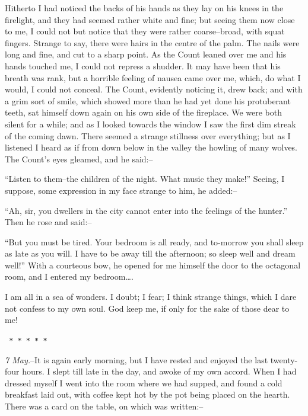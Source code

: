 \documentclass[12pt,openright]{book}
\begin{document}
Hitherto I had noticed the backs of his hands as they lay on his knees in the firelight, and they had seemed rather white and fine; but seeing them now close to me, I could not but notice that they were rather coarse–broad, with squat fingers. Strange to say, there were hairs in the centre of the palm. The nails were long and fine, and cut to a sharp point. As the Count leaned over me and his hands touched me, I could not repress a shudder. It may have been that his breath was rank, but a horrible feeling of nausea came over me, which, do what I would, I could not conceal. The Count, evidently noticing it, drew back; and with a grim sort of smile, which showed more than he had yet done his protuberant teeth, sat himself down again on his own side of the fireplace. We were both silent for a while; and as I looked towards the window I saw the first dim streak of the coming dawn. There seemed a strange stillness over everything; but as I listened I heard as if from down below in the valley the howling of many wolves. The Count’s eyes gleamed, and he said:–

“Listen to them–the children of the night. What music they make!” Seeing, I suppose, some expression in my face strange to him, he added:–

“Ah, sir, you dwellers in the city cannot enter into the feelings of the hunter.” Then he rose and said:–

“But you must be tired. Your bedroom is all ready, and to-morrow you shall sleep as late as you will. I have to be away till the afternoon; so sleep well and dream well!” With a courteous bow, he opened for me himself the door to the octagonal room, and I entered my bedroom….

I am all in a sea of wonders. I doubt; I fear; I think strange things, which I dare not confess to my own soul. God keep me, if only for the sake of those dear to me!

\texttt{   *       *       *       *       *}

\textit{7 May.}–It is again early morning, but I have rested and enjoyed the last twenty-four hours. I slept till late in the day, and awoke of my own accord. When I had dressed myself I went into the room where we had supped, and found a cold breakfast laid out, with coffee kept hot by the pot being placed on the hearth. There was a card on the table, on which was written:–
\end{document}
